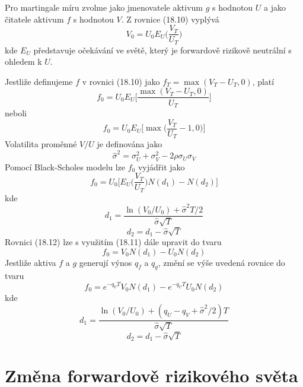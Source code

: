 \documentclass[a4paper]{book}
\begin{document}
Pro martingale míru zvolme jako jmenovatele aktivum $g$ s hodnotou $U$ a jako čitatele aktivum $f$ s hodnotou $V$. Z rovnice (18.10) vyplývá
\begin{equation*}
V_0 = U_0E_U \bigg( \frac{V_T}{U_T} \bigg)
\end{equation*}
kde $E_U$ představuje očekávání ve světě, který je forwardově rizikově neutrální s ohledem k $U$.

Jestliže definujeme $f$ v rovnici (18.10) jako $f_T = \max(V_T - U_T,0)$, platí
\begin{equation}
f_0 = U_0 E_U \Bigg[ \frac{\max(V_T - U_T,0)}{U_T} \Bigg]
\end{equation}
neboli
\begin{equation*}
f_0 = U_0 E_U \Bigg[ \max \Bigg( \frac{V_T}{U_T} -1 ,0 \Bigg) \Bigg]
\end{equation*}
Volatilita proměnné $V/U$ je definována jako
\begin{equation*}
\hat{\sigma}^2 = \sigma^2_U + \sigma^2_V - 2 \rho \sigma_U \sigma_V
\end{equation*}
Pomocí Black-Scholes modelu lze $f_0$ vyjádřit jako
\begin{equation}
f_0 = U_0 \Bigg[ E_U \Bigg( \frac{V_T}{U_T} \Bigg) N(d_1) - N(d_2) \Bigg]
\end{equation}
kde
\begin{equation*}
d_1 = \frac{\ln(V_0/U_0)+ \hat{\sigma}^2T/2}{\hat{\sigma} \sqrt{T}}
\end{equation*}
\begin{equation*}
d_2 = d_1 - \hat{\sigma} \sqrt{T}
\end{equation*}
Rovnici (18.12) lze s využitím (18.11) dále upravit do tvaru
\begin{equation*}
f_0 = V_0 N(d_1) - U_0 N(d_2)
\end{equation*}
Jestliže aktiva $f$ a $g$ generují výnos $q_f$ a $q_g$, změní se výše uvedená rovnice do tvaru
\begin{equation*}
f_0 = e^{-q_V T} V_0 N(d_1) - e^{-q_U T}U_0N(d_2)
\end{equation*}
kde
\begin{equation*}
d_1 = \frac{\ln(V_0/U_0)+(q_U - q_V + \hat{\sigma}^2/2)T}{\hat{\sigma}\sqrt{T}}
\end{equation*}
\begin{equation*}
d_2 = d_1 - \hat{\sigma} \sqrt{T}
\end{equation*}

\section{Změna forwardově rizikového světa}
\end{document}
